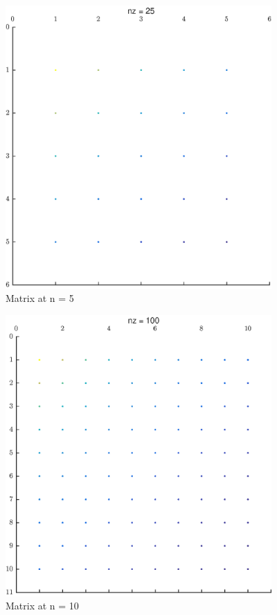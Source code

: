 \documentclass[11pt]{article}
\begin{document}
\begin{figure}[!hbt]
\begin{center}
	\includegraphics[width=4in]{math609_pa1_comp_example_3_n_5.eps}
	\caption{Matrix  at n = 5}
\end{center}
\end{figure}

\begin{figure}[!hbt]
\begin{center}
	\includegraphics[width=4in]{math609_pa1_comp_example_3_n_10.eps}
	\caption{Matrix  at n = 10}
\end{center}
\end{figure}
\end{document}
